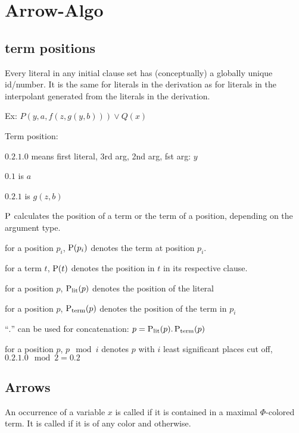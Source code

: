 \documentclass[,%
	paper=a4,%
	DIV12, %
	twoside=false,%
	liststotoc,
	bibtotoc,
	draft=false,%
	numbers=noendperiod
]{scrartcl}
\begin{document}
\newcommand{\lif}[1]{\lift{\Delta}{#1}{x}}



\section{Arrow-Algo}

\subsection{term positions}

Every literal in any initial clause set has (conceptually) a globally unique id/number.
It is the same for literals in the derivation as for literals in the interpolant generated from the literals in the derivation.

Ex: $P(y, a, f(z, g(y, b)) ) \lor Q(x)$

Term position:

$0.2.1.0$ means first literal, 3rd arg, 2nd arg, fst arg: $y$

$0.1$ is $a$

$0.2.1$ is $g(z, b)$

$\operatorname{{\operatorname P}}$ calculates the position of a term or the term of a position, depending on the argument type.

for a position $p_i$, $\operatorname{{\operatorname P}}(p_i)$ denotes the term at position $p_i$.

for a term $t$, $\operatorname{{\operatorname P}}(t)$ denotes the position in $t$ in its respective clause.

for a position $p$, $\operatorname{\operatorname{{\operatorname P}}_\mathrm{lit}}(p)$ denotes the position of the literal

for a position $p$, $\operatorname{\operatorname{{\operatorname P}}_\mathrm{term}}(p)$ denotes the position of the term in $p_i$ 

``$.$'' can be used for concatenation: $p = \operatorname{\operatorname{{\operatorname P}}_\mathrm{lit}}(p).\operatorname{\operatorname{{\operatorname P}}_\mathrm{term}}(p)$

for a position $p$, $p \mod i$ denotes $p$ with $i$ least significant places cut off, $0.2.1.0 \mod 2 = 0.2$

\subsection{Arrows}

\begin{defi}
	An occurrence of a variable $x$ is called  if it is contained in a maximal $\Phi$-colored term. It is called  if it is of any color and  otherwise.
\end{defi}
\end{document}
